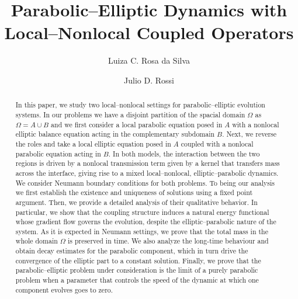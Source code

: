 \documentclass[reqno]{amsart}
\title[Parabolic--Elliptic Dynamics with Local--Nonlocal Coupled Operators]{Parabolic--Elliptic Dynamics with Local--Nonlocal Coupled Operators}
\numberwithin{equation}{section}
\begin{document}
\author[L.C. Rosa da Silva]
{Luiza C. Rosa da Silva}

\author[J. D. Rossi]
{Julio D. Rossi}



\address{Luiza Camile Rosa da Silva 
\hfill\break\indent Depto. de Matem\'atica, Instituto de Matem\'atica e Estat\'istica 
\hfill\break\indent Universidade de S\~ao Paulo, Rua do Mat\~ao 1010, S\~ao Paulo - SP - Brazil}

\address{Julio Daniel Rossi
\hfill\break\indent Depto. de Matematicas y Estadistica, Universidad Torcuatto di Tella
\hfill\break\indent Av. Pres. Figueroa Alcorta 7350, C1428, Buenos Aires - Argentina}



\date{}



\begin{abstract}
In this paper, we study two local--nonlocal settings for parabolic--elliptic evolution systems. 
In our problems we have a disjoint partition of the spacial domain $\Omega$ as $\Omega=A\cup B$
and we first consider a local parabolic equation posed in  
$A$ with a nonlocal elliptic balance equation acting in the complementary subdomain $B$. 
Next, we reverse the roles and take a local elliptic equation posed in  
$A$ coupled with a nonlocal parabolic equation acting in $B$.
In both models, the interaction between the two regions is driven by a nonlocal transmission term given by a kernel that transfers mass across the interface, giving rise to a mixed local--nonlocal, elliptic--parabolic dynamics.
We consider Neumann boundary conditions for both problems.
To being our analysis we first establish the existence and uniqueness of solutions using a fixed
point argument. Then, we provide a detailed analysis of their qualitative behavior. In particular, we show that the coupling structure induces a natural energy functional whose gradient flow governs the evolution, despite the elliptic--parabolic nature of the system. As it is expected in Neumann settings, we prove that the total mass in the whole domain $\Omega$ is preserved in time.
We also analyze the long-time behaviour and obtain decay estimates for the parabolic component, which in turn drive the convergence of the elliptic part to a constant solution. Finally, we prove that the parabolic--elliptic problem under consideration is
the limit of a purely parabolic problem when a parameter that controls the speed of the dynamic at which one component evolves goes to zero.
\end{abstract}
\end{document}
